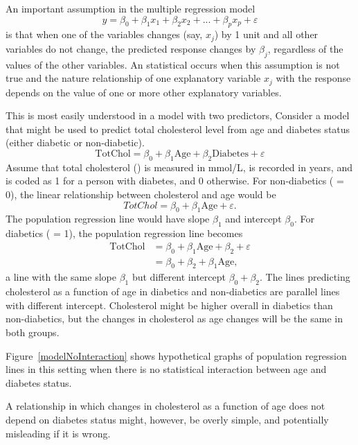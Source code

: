 An important assumption in the multiple regression model
\[y = \beta_0 + \beta_1x_1 + \beta_2x_2 + ... + \beta_px_p + \varepsilon \] 
is that when one of the variables changes (say, $x_j$) by 1 unit and all other variables do not change, the predicted response changes by $\beta_j$, regardless of the values of the other variables.  An statistical  occurs when this assumption is not true and the nature relationship of one explanatory variable $x_j$ with the response depends on the value of one or more other explanatory variables.

This is most easily understood in a model with two predictors,
Consider a model that might be used to predict total cholesterol level from age and diabetes status (either diabetic or non-diabetic).  
\[\text{TotChol} = \beta_0 + \beta_1\text{Age} + \beta_2\text{Diabetes} + \varepsilon \]
Assume that total cholesterol () is measured in mmol/L,  is recorded in years, and  is coded as 1 for a person with diabetes, and 0 otherwise.  For non-diabetics ( = 0), the linear relationship between cholesterol and age would be
\[TotChol = \beta_0 + \beta_1\text{Age} + \varepsilon. \]
The population regression line would have slope $\beta_1$ and intercept $\beta_0$.  For diabetics ( = 1), the population regression line becomes
\begin{align*}
\text{TotChol} &= \beta_0 + \beta_1\text{Age} + \beta_2 + \varepsilon \\
&= \beta_0 + \beta_2 + \beta_1\text{Age},
\end{align*}
a line with the same slope $\beta_1$ but different intercept $\beta_0 + \beta_2$.  The lines predicting cholesterol as a function of age in diabetics and non-diabetics are parallel lines with different intercept.  Cholesterol might be higher overall in diabetics than non-diabetics, but the changes in cholesterol as age changes will be the same in both groups.

Figure~\ref{modelNoInteraction} shows hypothetical  graphs of population regression lines in this setting when there is no statistical interaction between age and diabetes status.


A relationship in which changes in cholesterol as a function of age does not depend on diabetes status might, however, be overly simple, and potentially misleading if it is wrong.

